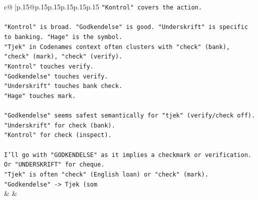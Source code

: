 \documentclass{article}
\begin{document}
{\begin{supertabular}{c@{$\;$}|p{.15\linewidth}@{}p{.15\linewidth}p{.15\linewidth}p{.15\linewidth}p{.15\linewidth}p{.15\linewidth}}
{{{\texttt{"Kontrol" covers the action.} \\
\\ 
\texttt{"Kontrol" is broad. "Godkendelse" is good. "Underskrift" is specific to banking. "Hage" is the symbol.} \\
\texttt{"Tjek" in Codenames context often clusters with "check" (bank), "check" (mark), "check" (verify).} \\
\texttt{"Kontrol" touches verify.} \\
\texttt{"Godkendelse" touches verify.} \\
\texttt{"Underskrift" touches bank check.} \\
\texttt{"Hage" touches mark.} \\
\\ 
\texttt{"Godkendelse" seems safest semantically for "tjek" (verify/check off).} \\
\texttt{"Underskrift" for check (bank).} \\
\texttt{"Kontrol" for check (inspect).} \\
\\ 
\texttt{I'll go with "GODKENDELSE" as it implies a checkmark or verification. Or "UNDERSKRIFT" for cheque.} \\
\texttt{"Tjek" is often "check" (English loan) or "check" (mark).} \\
\texttt{"Godkendelse" {-}> Tjek (som} \\
            }
        }
    }
    & & \\ \\


\end{supertabular}}
\end{document}

